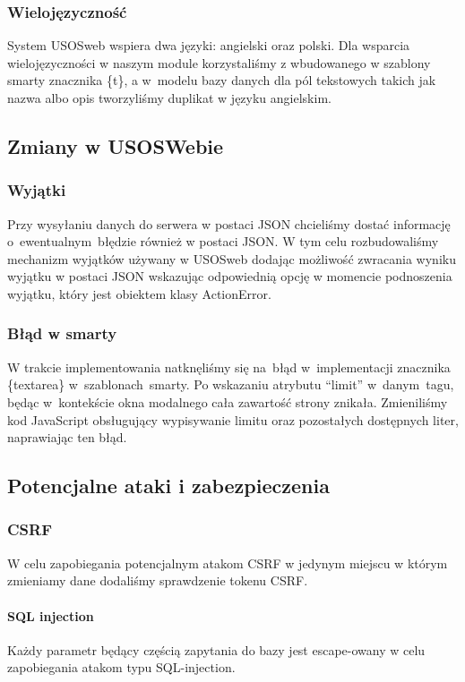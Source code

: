 \documentclass[licencjacka]{pracamgr}
\begin{document}
\subsubsection{Wielojęzyczność}
System USOSweb wspiera dwa języki: angielski oraz polski. Dla wsparcia wielojęzyczności w naszym module korzystaliśmy z wbudowanego w szablony smarty znacznika \{t\}, a w~modelu bazy danych dla pól tekstowych takich jak nazwa albo opis tworzyliśmy duplikat w języku angielskim.
\subsection{Zmiany w USOSWebie}
\subsubsection{Wyjątki}
Przy wysyłaniu danych do serwera w postaci JSON chcieliśmy dostać informację o~ewentualnym~błędzie również w postaci JSON. W tym celu rozbudowaliśmy mechanizm wyjątków używany w USOSweb dodając możliwość zwracania wyniku wyjątku w postaci JSON wskazując odpowiednią opcję w momencie podnoszenia wyjątku, który jest obiektem klasy ActionError.
\subsubsection{Błąd w smarty}
W trakcie implementowania natknęliśmy się na~błąd w~implementacji znacznika \{textarea\} w~szablonach~smarty. Po wskazaniu atrybutu \enquote{limit} w~danym~tagu, będąc w~kontekście okna modalnego cała zawartość strony znikała. Zmieniliśmy kod JavaScript obsługujący wypisywanie limitu oraz pozostałych dostępnych liter, naprawiając ten błąd.
\subsection{Potencjalne ataki i zabezpieczenia} \label{subsec:bezpiecz}
\subsubsection{CSRF}
W celu zapobiegania potencjalnym atakom CSRF w jedynym miejscu w którym zmieniamy dane dodaliśmy sprawdzenie tokenu CSRF.
\paragraph{SQL injection}
Każdy parametr będący częścią zapytania do bazy jest escape-owany w celu zapobiegania atakom typu SQL-injection.

\end{document}
